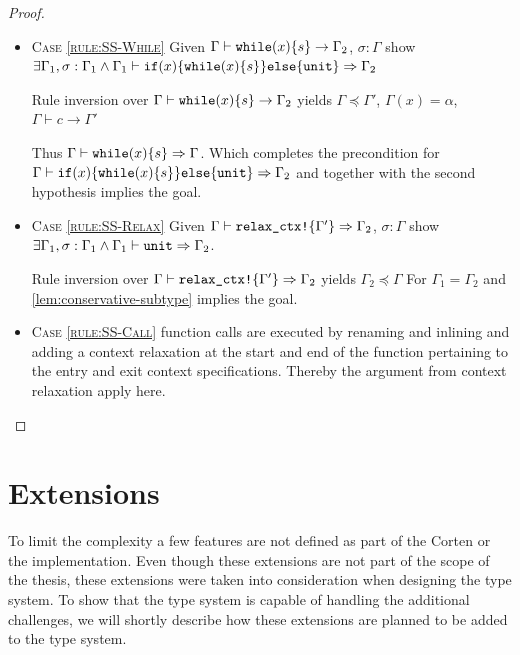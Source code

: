 \documentclass[twoside, english]{sdqthesis}
\theoremstyle{definition}
\begin{document}
\begin{proof}
\begin{itemize}
  \item \textsc{Case \cref{rule:SS-While}}
    Given $\Gamma \vdash \code{while}(x) \{s\} \rightarrow \Gamma_2$, $\sigma : \Gamma$ 
    show $\exists \Gamma_1, \sigma : \Gamma_1 \wedge \Gamma_1 \vdash \code{if}(x) \{\code{while}(x) \{s\}\}\code{else}\{\code{unit}\} \Rightarrow \Gamma_2$

    Rule inversion over $\Gamma \vdash \code{while}(x) \{s\} \rightarrow \Gamma_2$ yields $\Gamma \preceq \Gamma'$, $\Gamma(x) = \alpha$, $\Gamma \vdash c \rightarrow \Gamma'$

    Thus $\Gamma \vdash \code{while}(x) \{s\} \Rightarrow \Gamma$.
    Which completes the precondition for \\$\Gamma \vdash \code{if}(x) \{\code{while}(x) \{s\}\}\code{else}\{\code{unit}\} \Rightarrow \Gamma_2$ and together with the second hypothesis implies the goal.
  \item \textsc{Case \cref{rule:SS-Relax}} 
    Given $\Gamma \vdash \code{relax\_ctx!}\{\Gamma'\} \Rightarrow \Gamma_2$, $\sigma : \Gamma$ 
    show $ \exists \Gamma_1, \sigma : \Gamma_1 \wedge \Gamma_1 \vdash \code{unit} \Rightarrow \Gamma_2$.

    Rule inversion over $\Gamma \vdash \code{relax\_ctx!}\{\Gamma'\} \Rightarrow \Gamma_2$ yields $\Gamma_2 \preceq \Gamma$
    For $\Gamma_1 = \Gamma_2$ and \cref{lem:conservative-subtype} implies the goal.
  \item \textsc{Case \cref{rule:SS-Call}} function calls are executed by renaming and inlining and adding a context relaxation at the start and end of the function pertaining to the entry and exit context specifications. Thereby the argument from context relaxation apply here.
\end{itemize}
\end{proof}


\iftrue %
\section{Extensions}\label{sec:extensions}


To limit the complexity a few features are not defined as part of the Corten or the implementation.
Even though these extensions are not part of the scope of the thesis, these extensions were taken into consideration when designing the type system. To show that the type system is capable of handling the additional challenges, we will shortly describe how these extensions are planned to be added to the type system.
\end{document}
